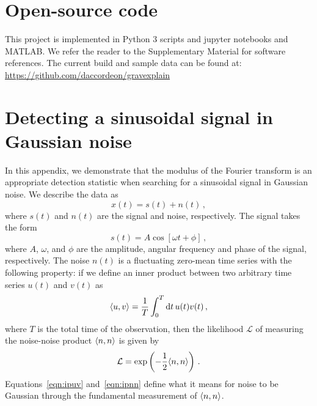 \documentclass[paper-main.tex]{subfiles}
\begin{document}
\section{Open-source code}
\label{app:code}
This project is implemented in Python 3 scripts and jupyter notebooks and MATLAB. 
We refer the reader to the Supplementary Material for software references. 
The current build and sample data can be found at:
\url{https://github.com/daccordeon/gravexplain}


\section{Detecting a sinusoidal signal in Gaussian noise}
\label{app:sinusoid_likelihood}

In this appendix, we demonstrate that the modulus of the Fourier transform is an appropriate detection statistic when searching for a sinusoidal signal in Gaussian noise. 
We describe the data as
\begin{equation}
x(t) = s(t) + n(t)\,, 
\label{eqn:GNdata}
\end{equation}
where $s(t)$ and $n(t)$ are the signal and noise, respectively.
The signal takes the form
\begin{equation}
s(t) = A \cos\left[{\omega t + \phi}\right]\,,
\label{eqn:GNmodel}
\end{equation}
where $A$, $\omega$, and $\phi$ are the amplitude, angular frequency and phase of the signal, respectively. 
The noise $n(t)$ is a fluctuating zero-mean time series with the following property: if we define an inner product between two arbitrary time series $u(t)$ and $v(t)$ as 
\begin{equation}
\langle u,v \rangle = \frac{1}{T} \int_0^T \mathrm{d} t \, u(t) v(t)\,,
\label{eqn:ipuv}
\end{equation}
where $T$ is the total time of the observation, then the likelihood $\mathcal{L}$ of measuring the noise-noise product $\langle n,n \rangle$ is given by 
\begin{equation}
\mathcal{L} = \exp\left( -\frac{1}{2}\langle n,n \rangle\right)\,.
\label{eqn:ipnn}
\end{equation}
Equations~\ref{eqn:ipuv} and~\ref{eqn:ipnn} define what it means for noise to be Gaussian through the fundamental measurement of $\langle n,n \rangle$.
\end{document}
